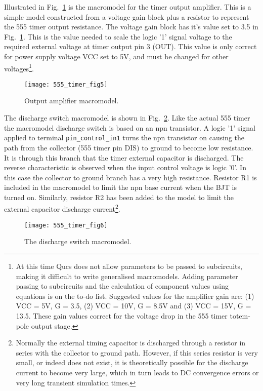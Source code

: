 Illustrated in Fig.~\ref{fig:555_timer_fig5} is the macromodel for the timer output amplifier. This is a simple model constructed from a voltage gain block plus a resistor to represent the 555 timer output resistance.  The voltage gain block has it's value set to 3.5 in Fig.~\ref{fig:555_timer_fig5}.  This is the value needed to scale the logic '1' signal voltage to the required external voltage at timer output pin 3 (OUT). This value is only correct for power supply voltage VCC set to 5V, and must be changed for other voltages\footnote{At this time Qucs does not allow parameters to be passed to subcircuits, making it difficult to write generalised macromodels.  Adding parameter passing to subcircuits and the calculation of component values using equations is on the to-do list. Suggested values for the amplifier gain are: (1) VCC = 5V, G = 3.5, (2) VCC = 10V, G = 8.5V and (3) VCC = 15V, G = 13.5. These gain values correct for the voltage drop in the 555 timer totem-pole output stage.}. 
\FloatBarrier
\begin{figure}[ht]
  \centering
  \texttt{[image: 555\_timer\_fig5]}
  \caption{Output amplifier macromodel.}
  \label{fig:555_timer_fig5} 
\end{figure} 
\FloatBarrier

The discharge switch macromodel is shown in Fig.~\ref{fig:555_timer_fig6}. Like the actual 555 timer the macromodel discharge switch is based on an npn transistor.  A logic '1' signal applied to terminal \verb|pin_control_in1| turns the npn transistor on causing the path from the collector (555 timer pin DIS) to ground to become low resistance.  It is through this branch that the timer external capacitor is discharged. The reverse characteristic is observed when the input control voltage is logic '0'. In this case the collector to ground branch has a very high resistance. Resistor R1 is included in the macromodel to limit the npn base current when the BJT is turned on.  Similarly, resistor R2 has been added to the model to limit the external capacitor discharge current\footnote{Normally the external timing capacitor is discharged through a resistor in series with the collector to ground path.  However, if this series resistor is very small, or indeed does not exist, it is theoretically possible for the discharge current to become very large, which in turn leads to DC convergence errors or very long transient simulation times.}.
\FloatBarrier
\begin{figure}[ht]
  \centering
  \texttt{[image: 555\_timer\_fig6]}
  \caption{The discharge switch macromodel.}
  \label{fig:555_timer_fig6} 
\end{figure} 
\FloatBarrier


